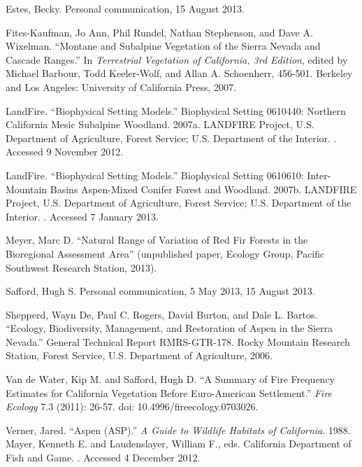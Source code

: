 \begin{hangparas}{.25in}{1} 

Estes, Becky. Personal communication, 15 August 2013.

Fites-Kaufman, Jo Ann, Phil Rundel, Nathan Stephenson, and Dave A. Wixelman. ``Montane and Subalpine Vegetation of the Sierra Nevada and Cascade Ranges.'' In \emph{Terrestrial Vegetation of California, 3rd Edition}, edited by Michael Barbour, Todd Keeler-Wolf, and Allan A. Schoenherr, 456-501. Berkeley and Los Angeles: University of California Press, 2007. 

LandFire. ``Biophysical Setting Models.'' Biophysical Setting 0610440: Northern California Mesic Subalpine Woodland. 2007a. LANDFIRE Project, U.S. Department of Agriculture, Forest Service; U.S. Department of the Interior. . Accessed 9 November 2012.

LandFire. ``Biophysical Setting Models.'' Biophysical Setting 0610610: Inter-Mountain Basins Aspen-Mixed Conifer Forest and Woodland. 2007b. LANDFIRE Project, U.S. Department of Agriculture, Forest Service; U.S. Department of the Interior. . Accessed 7 January 2013.

Meyer, Marc D. ``Natural Range of Variation of Red Fir Forests in the Bioregional Assessment Area'' (unpublished paper, Ecology Group, Pacific Southwest Research Station, 2013).

Safford, Hugh S. Personal communication, 5 May 2013, 15 August 2013.

Shepperd, Wayn De, Paul C. Rogers, David Burton, and Dale L. Bartos. ``Ecology, Biodiversity, Management, and Restoration of Aspen in the Sierra Nevada.'' General Technical Report RMRS-GTR-178. Rocky Mountain Research Station, Forest Service, U.S. Department of Agriculture, 2006.

Van de Water, Kip M. and Safford, Hugh D. ``A Summary of Fire Frequency Estimates for California Vegetation Before Euro-American Settlement.'' \emph{Fire Ecology} 7.3 (2011): 26-57. doi: 10.4996/fireecology.0703026.

Verner, Jared. ``Aspen (ASP).'' \emph{A Guide to Wildlife Habitats of California}. 1988. Mayer, Kenneth E. and Laudenslayer, William F., eds. California Department of Fish and Game. . Accessed 4 December 2012.

\end{hangparas}


